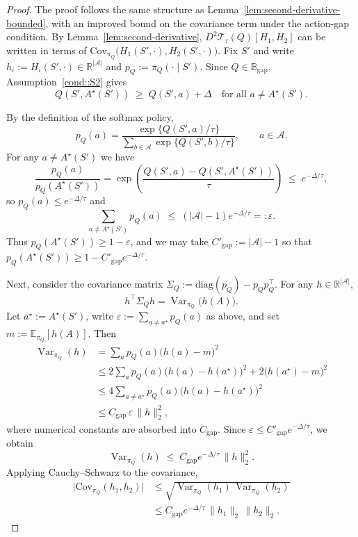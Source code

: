 \documentclass{article}
\DeclareMathOperator{\Var}{Var}
\newcommand{\Cov}{\mathrm{Cov}}
\theoremstyle{plain}
\theoremstyle{definition}
\theoremstyle{remark}
\newcommand{\E}{\mathbb{E}}
\begin{document}
\begin{proof}
The proof follows the same structure as
Lemma~\ref{lem:second-derivative-bounded}, with an improved bound on the
covariance term under the action-gap condition. By
Lemma~\ref{lem:second-derivative},
$D^2\mathcal{T}_\tau(Q)[H_1,H_2]$ can be written in terms of
$\Cov_{\pi_Q}\bigl(H_1(S',\cdot),H_2(S',\cdot)\bigr)$. Fix $S'$ and write
$h_i := H_i(S',\cdot)\in\mathbb{R}^{|\mathcal A|}$ and
$p_Q := \pi_Q(\cdot\mid S')$. Since $Q\in\mathbb B_{\mathrm{gap}}$,
Assumption~\ref{cond::S2} gives
\[
Q(S',A^\star(S')) \;\ge\; Q(S',a) + \Delta
\quad\text{for all }a\neq A^\star(S').
\]

By the definition of the softmax policy,
\[
p_Q(a)
=
\frac{\exp\{Q(S',a)/\tau\}}{\sum_{b\in\mathcal A} \exp\{Q(S',b)/\tau\}},
\qquad a\in\mathcal A.
\]
For any $a\neq A^\star(S')$ we have
\[
\frac{p_Q(a)}{p_Q(A^\star(S'))}
=
\exp\!\left(\frac{Q(S',a)-Q(S',A^\star(S'))}{\tau}\right)
\;\le\;
e^{-\Delta/\tau},
\]
so $p_Q(a)\le e^{-\Delta/\tau}$ and
\[
\sum_{a\neq A^\star(S')} p_Q(a)
\;\le\;
(|\mathcal A|-1)e^{-\Delta/\tau}
=: \varepsilon.
\]
Thus $p_Q(A^\star(S')) \ge 1-\varepsilon$, and we may take
$C'_{\mathrm{gap}} := |\mathcal A|-1$ so that
$p_Q(A^\star(S'))\ge 1 - C'_{\mathrm{gap}}e^{-\Delta/\tau}$.

Next, consider the covariance matrix
$\Sigma_Q := \mathrm{diag}(p_Q)-p_Qp_Q^\top$. For any
$h\in\mathbb R^{|\mathcal A|}$,
\[
h^\top \Sigma_Q h
=
\Var_{\pi_Q}\bigl(h(A)\bigr).
\]
Let $a^\star:=A^\star(S')$, write
$\varepsilon := \sum_{a\neq a^\star}p_Q(a)$ as above, and set
$m := \E_{\pi_Q}[h(A)]$. Then
\begin{align*}
\Var_{\pi_Q}(h)
&=
\sum_{a} p_Q(a)\bigl(h(a)-m\bigr)^2\\
&\le
2\sum_{a} p_Q(a)\bigl(h(a)-h(a^\star)\bigr)^2
+ 2\bigl(h(a^\star)-m\bigr)^2\\
&\le
4\sum_{a\neq a^\star} p_Q(a)\bigl(h(a)-h(a^\star)\bigr)^2\\
&\le
C_{\mathrm{gap}}\,\varepsilon\,\|h\|_2^2,
\end{align*}
where numerical constants are absorbed into $C_{\mathrm{gap}}$. Since
$\varepsilon \le C'_{\mathrm{gap}}e^{-\Delta/\tau}$, we obtain
\[
\Var_{\pi_Q}(h)
\;\le\;
C_{\mathrm{gap}} e^{-\Delta/\tau}\,\|h\|_2^2.
\]
Applying Cauchy--Schwarz to the covariance,
\begin{align*}
\bigl|\Cov_{\pi_Q}(h_1,h_2)\bigr|
&\le
\sqrt{\Var_{\pi_Q}(h_1)\,\Var_{\pi_Q}(h_2)}\\
&\le
C_{\mathrm{gap}}e^{-\Delta/\tau}\,
\|h_1\|_2\,\|h_2\|_2.
\end{align*}


\end{proof}
\end{document}
